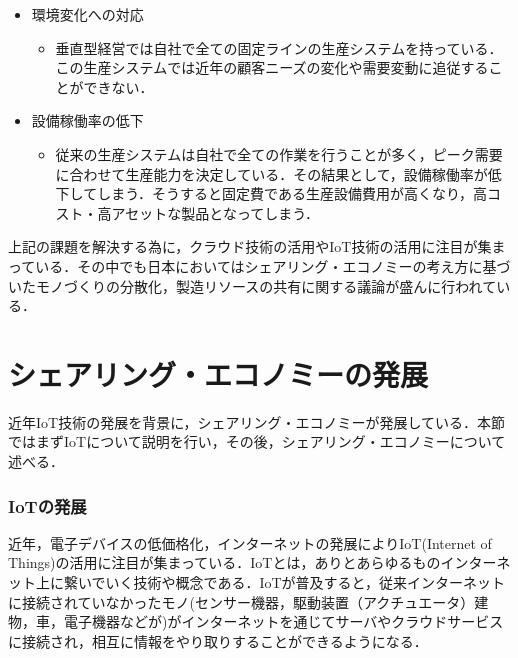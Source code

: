 \begin{itemize}
\tightlist
\item
  環境変化への対応

  \begin{itemize}
  \tightlist
  \item
    垂直型経営では自社で全ての固定ラインの生産システムを持っている．この生産システムでは近年の顧客ニーズの変化や需要変動に追従することができない．
  \end{itemize}
\item
  設備稼働率の低下

  \begin{itemize}
  \tightlist
  \item
    従来の生産システムは自社で全ての作業を行うことが多く，ピーク需要に合わせて生産能力を決定している．その結果として，設備稼働率が低下してしまう．そうすると固定費である生産設備費用が高くなり，高コスト・高アセットな製品となってしまう．
  \end{itemize}
\end{itemize}

上記の課題を解決する為に，クラウド技術の活用やIoT技術の活用に注目が集まっている．その中でも日本においてはシェアリング・エコノミーの考え方に基づいたモノづくりの分散化，製造リソースの共有に関する議論が盛んに行われている\cite{IVI}．

\hypertarget{ux30b7ux30a7ux30a2ux30eaux30f3ux30b0ux30a8ux30b3ux30ceux30dfux30fcux306eux767aux5c55}{%
\section{シェアリング・エコノミーの発展}\label{ux30b7ux30a7ux30a2ux30eaux30f3ux30b0ux30a8ux30b3ux30ceux30dfux30fcux306eux767aux5c55}}

近年IoT技術の発展を背景に，シェアリング・エコノミーが発展している．本節ではまずIoTについて説明を行い，その後，シェアリング・エコノミーについて述べる．

\hypertarget{iotux306eux767aux5c55}{%
\subsubsection{IoTの発展}\label{iotux306eux767aux5c55}}

近年，電子デバイスの低価格化，インターネットの発展によりIoT(Internet of
Things)の活用に注目が集まっている．IoTとは，ありとあらゆるものインターネット上に繋いでいく技術や概念である\cite{IoT2009}．IoTが普及すると，従来インターネットに接続されていなかったモノ(センサー機器，駆動装置（アクチュエータ）建物，車，電子機器などが)がインターネットを通じてサーバやクラウドサービスに接続され，相互に情報をやり取りすることができるようになる\cite{AWS-IoT}．

